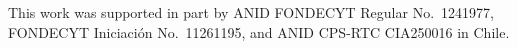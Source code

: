 This work was supported in part by ANID FONDECYT Regular No.\ 1241977, FONDECYT Iniciaci\'on No.\ 11261195, and
ANID CPS-RTC CIA250016 in Chile.
